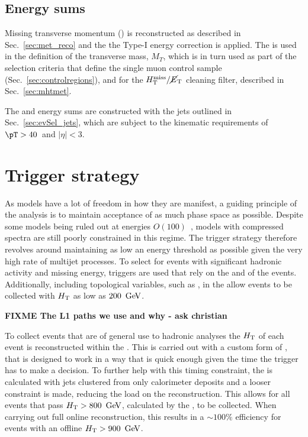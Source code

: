 \subsection{Energy sums}

Missing transverse momentum (\MET) is reconstructed as described in
Sec.~\ref{sec:met_reco} and the the Type-I \MET energy correction is applied.
The \met is used in the definition of 
the transverse mass, $M_{T}$, which is in turn used as part of
the selection criteria that define the single muon control sample 
(Sec.~\ref{sec:controlregions}), and for the $\mbox{$\mbox{$H_{\rm T}^{\rm miss}$} / \mbox{$\cancel{E}_\text{T}$}$}$ cleaning
filter, described in Sec.~\ref{sec:mhtmet}.

The \HT and \MHT energy sums are constructed with the jets outlined in
Sec.~\ref{sec:evSel_jets}, which are subject to the kinematic requirements of
$\pT>40$~\gev and $|\eta|<3$.

\section{Trigger strategy}

As \SUSY models have a lot of freedom in how they are manifest, a
guiding principle of the analysis is to maintain acceptance of as much
phase space as possible. Despite some \SUSY models being ruled out at
energies $O(100)$~\gev, models with compressed spectra are still poorly
constrained in this regime. The trigger strategy therefore revolves
around maintaining as low an energy threshold as possible given the
very high rate of \QCD multijet processes. To select for events with
significant hadronic activity and missing energy, triggers are used
that rely on the \HT and \MHT of the events. Additionally, including
topological variables, such as \alphat, in the \HLT allow events to be
collected with $\mbox{$H_\text{T}$}$ as low as $200~\mathrm{\,Ge\kern -0.1em V}$.

\bf{FIXME} The L1 paths we use and why - ask christian

To collect events that are of general use to hadronic analyses the
$\mbox{$H_\text{T}$}$ of each event is reconstructed within the \HLT. This is carried
out with a custom form of \PF, that is designed to work in a way that
is quick enough given the time the trigger has to make a decision. To
further help with this timing constraint, the \HT is calculated with
jets clustered from only calorimeter deposits and a looser constraint
is made, reducing the load on the \PF reconstruction. This allows for
all events that pass $\mbox{$H_\text{T}$}>800~\mathrm{\,Ge\kern -0.1em V}$, calculated by the \HLT,
to be collected. When carrying out full online reconstruction, this
results in a $\sim 100\%$ efficiency for events with an offline
$\mbox{$H_\text{T}$}>900~\mathrm{\,Ge\kern -0.1em V}$. 

